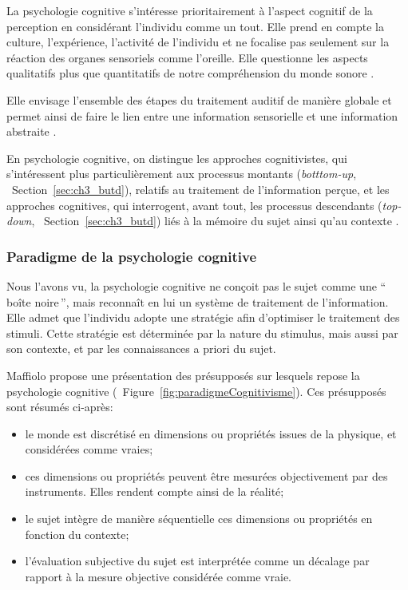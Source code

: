 La psychologie cognitive s'intéresse prioritairement à l'aspect cognitif de la perception en considérant l'individu comme un tout. Elle prend en compte la culture, l'expérience, l'activité de l'individu et ne focalise pas seulement sur la réaction des organes sensoriels comme l'oreille. Elle questionne les aspects qualitatifs plus que quantitatifs de notre compréhension du monde sonore \citep[p. ??]{maffiolo_caracterisation_1999}.

Elle envisage l'ensemble des étapes du traitement auditif de manière globale et permet ainsi de faire le lien entre une information sensorielle et une information abstraite \citep{mcadams1994penser}.

En psychologie cognitive, on distingue les approches cognitivistes, qui s'intéressent plus particulièrement aux processus montants (\emph{botttom-up}, \cf~Section~\ref{sec:ch3_butd}), relatifs au traitement de l'information perçue, et les approches cognitives, qui interrogent, avant tout, les processus descendants (\emph{top-down}, \cf~Section~\ref{sec:ch3_butd}) liés à la mémoire du sujet ainsi qu'au contexte \citep[p. ??]{guastavino_etude_2003}.

\subsubsection{Paradigme de la psychologie cognitive}
\label{sec:ch3_psychoCog}

Nous l'avons vu, la psychologie cognitive ne conçoit pas le sujet comme une ``\,boîte noire\,'', mais reconnaît en lui un système de traitement de l'information. Elle admet que l'individu adopte une stratégie afin d'optimiser le traitement des stimuli. Cette stratégie est déterminée par la nature du stimulus, mais aussi par son contexte, et par les connaissances a priori du sujet.

Maffiolo \citep[p. ??]{maffiolo_caracterisation_1999} propose une présentation des présupposés sur lesquels repose la psychologie cognitive (\cf~Figure~\ref{fig:paradigmeCognitivisme}). Ces présupposés sont résumés ci-après:

\begin{itemize}
\item le monde est discrétisé en dimensions ou propriétés issues de la physique, et considérées comme vraies;
\item ces dimensions ou propriétés peuvent être mesurées objectivement par des instruments. Elles rendent compte ainsi de la réalité;
\item le sujet intègre de manière séquentielle ces dimensions ou propriétés en fonction du contexte;
\item l'évaluation subjective du sujet est interprétée comme un décalage par rapport à la mesure objective considérée comme vraie.
\end{itemize}

